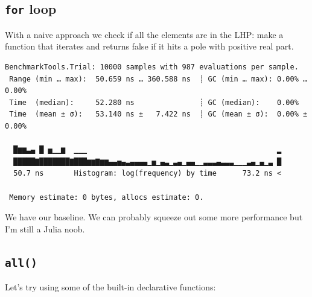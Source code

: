 \documentclass[
  8pt,
  a4paper,
]{book}
\newenvironment{Shaded}{\begin{snugshade}}{\end{snugshade}}
\newcommand{\ConstantTok}[1]{\textcolor[rgb]{0.56,0.35,0.01}{#1}}
\newcommand{\ControlFlowTok}[1]{\textcolor[rgb]{0.00,0.23,0.31}{\textbf{#1}}}
\newcommand{\FloatTok}[1]{\textcolor[rgb]{0.68,0.00,0.00}{#1}}
\newcommand{\FunctionTok}[1]{\textcolor[rgb]{0.28,0.35,0.67}{#1}}
\newcommand{\KeywordTok}[1]{\textcolor[rgb]{0.00,0.23,0.31}{\textbf{#1}}}
\newcommand{\NormalTok}[1]{\textcolor[rgb]{0.00,0.23,0.31}{#1}}
\newcommand{\OperatorTok}[1]{\textcolor[rgb]{0.37,0.37,0.37}{#1}}
\newcommand{\PreprocessorTok}[1]{\textcolor[rgb]{0.68,0.00,0.00}{#1}}
\begin{document}
\subsection{\texorpdfstring{\texttt{for}
loop}{for loop}}\label{for-loop}

With a naive approach we check if all the elements are in the LHP: make
a function that iterates and returns false if it hits a pole with
positive real part.

\begin{Shaded}
\end{Shaded}

\begin{verbatim}
BenchmarkTools.Trial: 10000 samples with 987 evaluations per sample.
 Range (min … max):  50.659 ns … 360.588 ns  ┊ GC (min … max): 0.00% … 0.00%
 Time  (median):     52.280 ns               ┊ GC (median):    0.00%
 Time  (mean ± σ):   53.140 ns ±   7.422 ns  ┊ GC (mean ± σ):  0.00% ± 0.00%

  █▆▆▃▄ █ ▅▁▁▆  ▁▁▁                                            ▂
  █████▇███████▇███▆▆▇▆▆▄▄▅▄▃▄▄▄▄▁▅▁▄▃▁▃▄▁▄▄▁▁▃▃▃▄▃▃▃▁▁▁▃▄▁▄▁▃ █
  50.7 ns       Histogram: log(frequency) by time      73.2 ns <

 Memory estimate: 0 bytes, allocs estimate: 0.
\end{verbatim}

We have our baseline. We can probably squeeze out some more performance
but I'm still a Julia noob.

\subsection{\texorpdfstring{\texttt{all()}}{all()}}\label{all}

Let's try using some of the built-in declarative functions:
\end{document}
